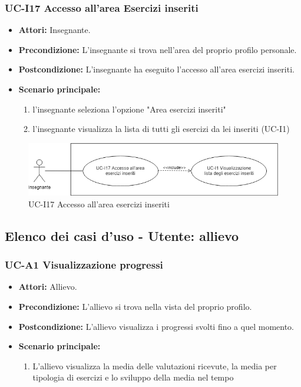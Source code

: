 \subsubsection{UC-I17 Accesso all'area Esercizi inseriti}		
\begin{itemize}
	\item \textbf{Attori:} Insegnante.
	\item \textbf{Precondizione:} L'insegnante si trova nell'area del proprio profilo personale.
	\item \textbf{Postcondizione:} L'insegnante ha eseguito l'accesso all'area esercizi inseriti.
	\item \textbf{Scenario principale:}
	\begin{enumerate}
		\item l'insegnante seleziona l'opzione "Area esercizi inseriti"
		\item l'insegnante visualizza la lista di tutti gli esercizi da lei inseriti (UC-I1)
	\end{enumerate}	
\end{itemize}
\begin{figure}[h]
		\centering
		\includegraphics[scale=0.7]{images/UC-I17.png}
		\caption{UC-I17 Accesso all'area esercizi inseriti}
	\end{figure}	

\subsection{Elenco dei casi d'uso - Utente: allievo}
	\subsubsection{UC-A1 Visualizzazione progressi}
	\begin{itemize}
			\item \textbf{Attori:} Allievo.
			\item \textbf{Precondizione:} L'allievo si trova nella vista del proprio profilo.
			\item \textbf{Postcondizione:} L'allievo visualizza i progressi svolti fino a quel momento.
			\item \textbf{Scenario principale:}
				\begin{enumerate}
					\item L'allievo visualizza la media delle valutazioni ricevute, la media per tipologia di esercizi e lo sviluppo della media nel tempo
				\end{enumerate}
	\end{itemize}
	
